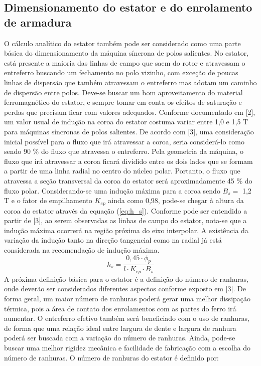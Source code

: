 \documentclass[conference]{IEEEtran}
\begin{document}
\subsection{Dimensionamento do estator e do enrolamento de armadura}
O cálculo analítico do estator também pode ser considerado como uma parte básica do dimensionamento da máquina síncrona de polos salientes. No estator, está presente a maioria das linhas de campo que saem do rotor e atravessam o entreferro buscando um fechamento no polo vizinho, com exceção de poucas linhas de dispersão que também atravessam o entreferro mas adotam um caminho de dispersão entre polos. Deve-se buscar um bom aproveitamento do material ferromagnético do estator, e sempre tomar em conta os efeitos de saturação e perdas que precisam ficar com valores adequados. Conforme documentado em [2], um valor usual de indução na coroa do estator costuma variar entre 1,0 e 1,5 T para máquinas síncronas de polos salientes. De acordo com [3], uma consideração inicial possível para o fluxo que irá atravessar a coroa, seria considerá-lo como sendo 90 \% do fluxo que atravessa o entreferro. Pela geometria da máquina, o fluxo que irá atravessar a coroa ficará dividido entre os dois lados que se formam a partir de uma linha radial no centro do núcleo polar. Portanto, o fluxo que atravessa a seção transversal da coroa do estator será aproximadamente 45 \% do fluxo polar. Considerando-se uma indução máxima para a coroa sendo $B_s = $ 1,2 T e o fator de empilhamento $K_{ep}$ ainda como 0,98, pode-se chegar à altura da coroa do estator através da equação (\ref{eq:h_s}). Conforme pode ser entendido a partir de [3], ao serem observadas as linhas de campo do estator, nota-se que a indução máxima ocorrerá na região próxima do eixo interpolar. A existência da variação da indução tanto na direção tangencial como na radial já está considerada na recomendação de indução máxima.     
\begin{equation}
h_s = \frac{0,45\cdot\phi_p}{l \cdot K_{ep}\cdot B_s}
\label{eq:h_s}
\end{equation}
A próxima definição básica para o estator é a definição do número de ranhuras, onde deverão ser considerados diferentes aspectos conforme exposto em [3]. De forma geral, um maior número de ranhuras poderá gerar uma melhor dissipação térmica, pois a área de contato dos enrolamentos com as partes do ferro irá aumentar. O entreferro efetivo também será beneficiado com o uso de ranhuras, de forma que uma relação ideal entre largura de dente e largura de ranhura poderá ser buscada com a variação do número de ranhuras.  Ainda, pode-se buscar uma melhor rigidez mecânica e facilidade de fabricação com a escolha do número de ranhuras. O número de ranhuras do estator é definido por:
\end{document}
